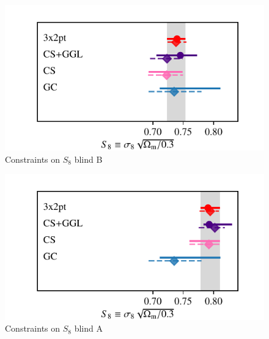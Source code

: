 \begin{figure}
	\begin{center}
		\includegraphics[width=\columnwidth]{Parameter_Plots/systematics/S8_comparison_blindB}
		\caption{Constraints on $S_{8}$ blind B}
		\label{fig:S8compB}
	\end{center}
\end{figure}

\begin{figure}
	\begin{center}
		\includegraphics[width=\columnwidth]{Parameter_Plots/systematics/S8_comparison_blindA}
		\caption{Constraints on $S_{8}$ blind A}
		\label{fig:S8compA}
	\end{center}
\end{figure}


